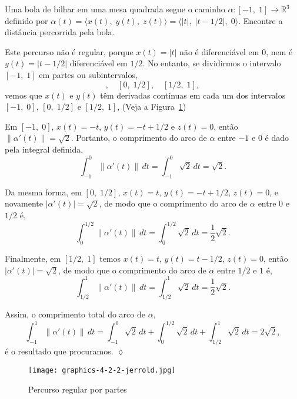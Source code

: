\bigskip
\begin{exc}
Uma bola de bilhar em uma mesa quadrada segue o caminho $\alpha \colon [-1,\; 1] \to \mathbb{R}^{3}$ definido por $\alpha(t) =\langle x(t),\; y (t),\; z (t)\rangle =\langle |t|,\; |t-1/2|,\; 0\rangle $. Encontre a distância percorrida pela bola.
\end{exc}

\solo
Este percurso não é regular, porque $x(t) = |t|$ não é diferenciável em $0$, nem é $y(t) = |t-1/2|$ diferenciável em $1/2$. No entanto, se dividirmos o intervalo $[-1,\; 1]$ em partes ou subintervalos,
\begin{equation*}
[-1, \; 0], \quad  [0, \; 1/2], \quad  [1/2, \; 1],
\end{equation*}
vemos que $x(t)$ e $y(t)$ têm derivadas contínuas em cada um dos intervalos $[-1,\; 0]$, $[0,\; 1/2]$ e $[1/2,\; 1]$, (Veja a Figura~\ref{fig:4-2-2-jerrold})

Em $[-1,\; 0]$, $x(t) =-t$, $y(t) =-t + 1/2$ e $z (t) = 0$, então $\|\alpha'(t)\|=\sqrt{2}$. Portanto, o comprimento do arco de $\alpha$ entre $-1$ e
$0$ é dado pela integral definida,
\begin{equation*}
\int_{-1}^{0} \|\alpha'(t)\|\, dt=\int_{-1}^{0} \sqrt{2}\, dt = \sqrt{2}.
\end{equation*}

Da mesma forma, em $[0,\; 1/2]$, $x(t) = t$, $y(t)=-t + 1/2$, $z(t)=0$, e novamente $|\alpha'(t)|=\sqrt{2}$, de modo que o comprimento do arco de
$\alpha$ entre $0$ e $1/2$ é,
\begin{equation*}
\int_{0}^{1/2} \|\alpha'(t)\|\, dt=\int_{0}^{1/2} \sqrt{2}\, dt = \dfrac{1}{2}\sqrt{2}.
\end{equation*}

Finalmente, em $[1/2,\; 1]$ temos $x(t) = t$, $y(t)=t-1/2$, $z(t)=0$, então $|\alpha'(t)|=\sqrt{2}$, de modo que o comprimento do arco de $\alpha$ entre
$1/2$ e $1$ é,
\begin{equation*}
\int_{1/2}^{1} \|\alpha'(t)\|\, dt=\int_{1/2}^{1} \sqrt{2}\, dt = \dfrac{1}{2}\sqrt{2}.
\end{equation*}

Assim, o comprimento total do arco de $\alpha$,
\begin{equation*}
\int_{-1}^{1}\|\alpha'(t)\|\, dt=\int_{-1}^{0}\sqrt{2}\, dt+\int_{0}^{1/2}\sqrt{2}\, dt + \int_{1/2}^{1}\sqrt{2}\, dt =2\sqrt{2},
\end{equation*}
é o resultado que procuramos. \hfill $\lozenge$

\begin{figure}[H]
  \centering
  \texttt{[image: graphics-4-2-2-jerrold.jpg]}
  \caption{Percurso regular por partes}
  \label{fig:4-2-2-jerrold}
\end{figure}

